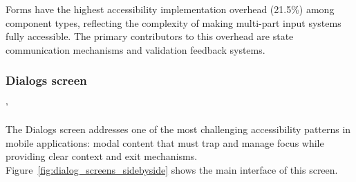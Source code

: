 Forms have the highest accessibility implementation overhead (21.5\%) among component types, reflecting the complexity of making multi-part input systems fully accessible. The primary contributors to this overhead are state communication mechanisms and validation feedback systems.

\subsubsection{Dialogs screen}'
\label{subsubsec:dialogs-screen}

The Dialogs screen addresses one of the most challenging accessibility patterns in mobile applications: modal content that must trap and manage focus while providing clear context and exit mechanisms. Figure~\ref{fig:dialog_screens_sidebyside} shows the main interface of this screen.

